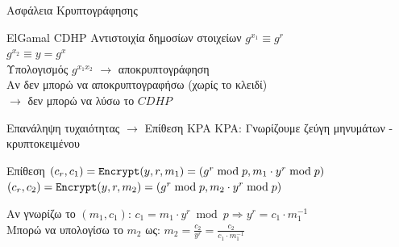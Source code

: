 \documentclass[handout]{beamer}
\begin{document}
\begin{frame}{Ασφάλεια Κρυπτογράφησης}
\begin{block}{ElGamal \equiv CDHP}
Αντιστοιχία δημοσίων στοιχείων
$g^{x_1} \equiv g^r$ \\
$g^{x_2} \equiv y=g^x$ \\
Υπολογισμός $g^{x_1x_2}$ $\rightarrow$ αποκρυπτογράφηση \\

Αν δεν μπορώ να αποκρυπτογραφήσω (χωρίς το κλειδί)\\ $\rightarrow$ δεν μπορώ να λύσω το $CDHP$
\end{block}
\end{frame}

\begin{frame}{Επανάληψη τυχαιότητας $\rightarrow$ Επίθεση KPA}
KPA: Γνωρίζουμε  ζεύγη μηνυμάτων - κρυπτοκειμένου 
\pause
\begin{block}{Επίθεση}
$(c_r,c_1) = \mathtt{Encrypt}(y,r,m_1) = (g^r \bmod p, m_1 \cdot y^r \bmod p)$
$(c_r,c_2) = \mathtt{Encrypt}(y,r,m_2) = (g^r \bmod p, m_2 \cdot y^r \bmod p)$
\end{block}
\pause
Αν γνωρίζω το $(m_1,c_1)$:
$c_1 = m_1 \cdot y^r \bmod p \Rightarrow y^r = c_1 \cdot m_1^{-1}$\\
\medskip
\pause
Μπορώ να υπολογίσω το $m_2$ ως:
$m_2 = \frac{c_2}{y^r} = \frac{c_2}{c_1 \cdot m_1^{-1}}$
\end{frame}
\end{document}
